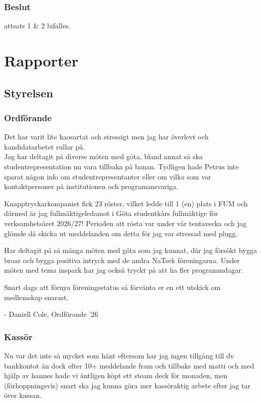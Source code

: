 \documentclass[protokoll]{dvd}
\begin{document}
\subsubsection*{Beslut}
\begin{attsatser}
    \item attsats 1 \& 2 bifalles.
\end{attsatser}

\newpage

\section{Rapporter}

\subsection{Styrelsen}

\subsubsection*{Ordförande}
Det har varit lite kaosartat och stressigt men jag har överlevt och kandidatarbetet rullar på.\\
Jag har deltagit på diverse möten med göta, bland annat så ska studentrepresentation nu vara tillbaka på banan. Tydligen hade Petrus inte sparat någon info om studentrepresentanter eller om vilka som var kontaktpersoner på institutionen och programansvariga. 

Knapptryckarkompaniet fick 23 röster, vilket ledde till 1 (en) plats i FUM och därmed är jag fullmäktigeledamot i Göta studentkårs fullmäktige för verksamhetsåret 2026/27! 
Perioden att rösta var under vår tentavecka och jag glömde då skicka ut meddelanden om detta för jag var stressad med plugg. 

Har deltagit på så många möten med göta som jag kunnat, där jag försökt bygga broar och bygga positiva intryck med de andra NaTsek föreningarna. Under möten med tema inspark har jag också tryckt på att ha fler programmdagar. 

Snart dags att förnya föreningsstatus så förvänta er en ett utskick om medlemskap snarast. 

 - Daniell Cole, Ordförande '26

\subsubsection*{Kassör}
Nu var det inte så mycket som hänt eftersom har jag ingen tillgång till dv bankkontot än dock efter 10+ meddelande fram och tillbaks med matti och med hjälp av hannes hade vi äntligen köpt ett steam deck för monaden, men (förhoppningsvis) snart ska jag kunna göra mer kassöraktig arbete efter jag tar över kassan.
\end{document}
